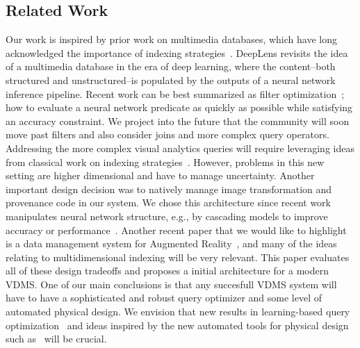 \subsection{Related Work}
Our work is inspired by prior work on multimedia databases, which have long acknowledged the importance of indexing strategies~\cite{yoshitaka1999survey, faloutsos2012searching}.
\textsf{DeepLens} revisits the idea of a multimedia database in the era of deep learning, where the content--both structured and unstructured--is populated by the outputs of a neural network inference pipeline.
Recent work can be best summarized as filter optimization~\cite{kang2017noscope, zhang2018ffs, anderson2018physical, jiang2018chameleon}; how to evaluate a neural network predicate as quickly as possible while satisfying an accuracy constraint.
We project into the future that the community will soon move past filters and also consider joins and more complex query operators.
Addressing the more complex visual analytics queries will require leveraging ideas from classical work on indexing strategies~\cite{faloutsos2012searching}.
However, problems in this new setting are higher dimensional and have to manage uncertainty.
Another important design decision was to natively manage image transformation and provenance code in our system.
We chose this architecture since recent work manipulates neural network structure, e.g., by cascading models to improve accuracy or performance~\cite{kang2017noscope, anderson2018physical, jiang2018mainstream}.
Another recent paper that we would like to highlight is a data management system for Augmented Reality~\cite{haynes2018lightdb}, and many of the ideas relating to multidimensional indexing will be very relevant.
This paper evaluates all of these design tradeoffs and proposes a initial architecture for a modern VDMS.
One of our main conclusions is that any succesfull VDMS system will have to have a sophisticated and robust query optimizer and some level of automated physical design. 
We envision that new results in learning-based query optimization~\cite{kaftan2018cuttlefish,krishnan2018deeprljoins} and ideas inspired by the new automated tools for physical design such as~\cite{sharma2018case,pavlo2017self} will be crucial.











